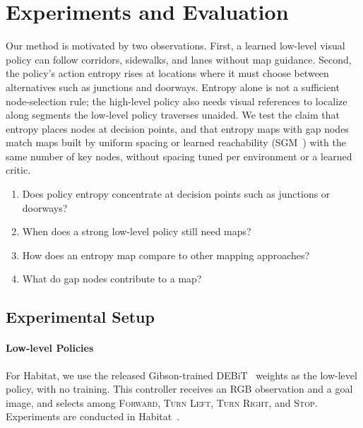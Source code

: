\section{Experiments and Evaluation}
\label{sec:experiments}
Our method is motivated by two observations. First, a learned low-level visual policy can follow corridors, sidewalks, and lanes without map guidance. Second, the policy's action entropy rises at locations where it must choose between alternatives such as junctions and doorways. Entropy alone is not a sufficient node-selection rule; the high-level policy also needs visual references to localize along segments the low-level policy traverses unaided.
We test the claim that entropy places nodes at decision points, and that entropy maps with gap nodes match maps built by uniform spacing or learned reachability (SGM~\cite{emmons2020sparse}) with the same number of key nodes, without spacing tuned per environment or a learned critic.
\begin{enumerate}
    \item[Q1.] Does policy entropy concentrate at decision points such as junctions or doorways?
    \item[Q2.] When does a strong low-level policy still need maps?
    \item[Q3.] How does an entropy map compare to other mapping approaches?
    \item[Q5.] What do gap nodes contribute to a map?
\end{enumerate}

\subsection{Experimental Setup}
\label{sec:exp-setup}
\paragraph{Low-level Policies}
For Habitat, we use the released Gibson-trained DEBiT~\cite{bono2024end} weights as the low-level policy, with no training.
This controller receives an RGB observation
and a goal image, and selects among
\textsc{Forward}, \textsc{Turn Left}, \textsc{Turn Right},
and \textsc{Stop}.
Experiments are conducted in Habitat~\cite{habitat19iccv}.

